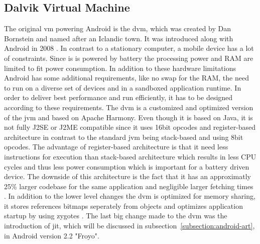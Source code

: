 \subsection{Dalvik Virtual Machine} \label{subsection:android-dalvik}
The original \gls{vm} powering Android is the \gls{dvm}, which was created by Dan Bornstein and named after an Iclandic town. It was introduced along with Android in 2008 \cite{developersRelease}.
\newline
In contrast to a stationary computer, a mobile device has a lot of constraints.
Since is is powered by battery the processing power and RAM are limited to fit power consumption.
In addition to these hardware limitations Android has some additional requirements, like no swap for the RAM, the need to run on a diverse set of devices and in a sandboxed application runtime.
In order to deliver best performance and run efficiently, it has to be designed according to these requirements.
The \gls{dvm} is a customized and optimized version of the \gls{jvm} and based on Apache Harmony.
Even though it is based on Java, it is not fully J2SE or J2ME compatible since it uses 16bit opcodes and register-based architecture in contrast to the standard \gls{jvm} being stack-based and using 8bit opcodes.
The advantage of register-based architecture is that it need less instructions for execution than stack-based architecture which results in less CPU cycles and thus less power consumption which is important for a battery driven device.
The downside of this architecture is the fact that it has an approximatly 25\% larger codebase for the same application and negligible larger fetching times \cite{ehringerDalvik}.
In addition to the lower level changes the \gls{dvm} is optimized for memory sharing, it stores references bitmaps seperately from objects and optimizes application startup by using zygotes \cite{andevconDalvikART}.
\newline
The last big change made to the \gls{dvm} was the introduction of \gls{jit}, which will be discussed in subsection~\ref{subsection:android-art}, in Android version 2.2 "Froyo".
